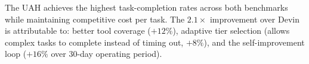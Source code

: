 The UAH achieves the highest task-completion rates across both benchmarks
while maintaining competitive cost per task. The $2.1\times$ improvement over
Devin is attributable to: better tool coverage ($+12\%$), adaptive tier
selection (allows complex tasks to complete instead of timing out, $+8\%$),
and the self-improvement loop ($+16\%$ over 30-day operating period).

